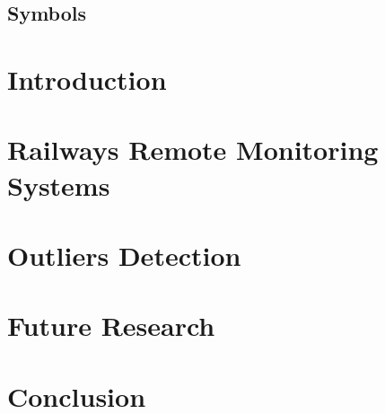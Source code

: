 \documentclass{report}%
\begin{document}




\begin{Prolog}
\cleardoublepage

\tableofcontents


\printnomenclature

\chapter*{Symbols}


	
\end{Prolog}

\StartBody

\chapter{Introduction}



\chapter{Railways Remote Monitoring Systems}


\chapter{Outliers Detection}


\chapter{Future Research}


\chapter{Conclusion}





%
%
\end{document}
